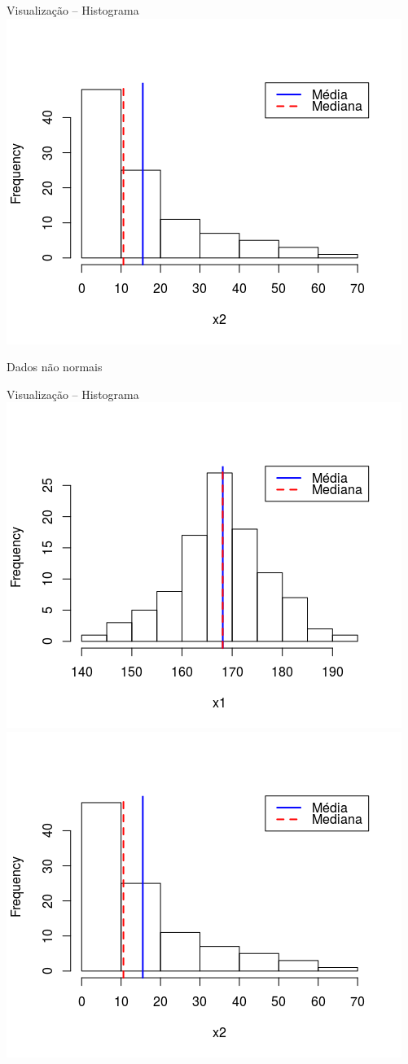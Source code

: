 \documentclass{beamer}
\begin{document}
\begin{frame}{\scriptsize Visualização -- Histograma}
  \centering
  \includegraphics[width=.7\textwidth]{Cap37-38/lognormal2-h}

  Dados não normais
\end{frame}

\begin{frame}{\scriptsize Visualização -- Histograma}
  \centering
  \includegraphics[width=.5\textwidth]{Cap37-38/normal2-h}
  \includegraphics[width=.5\textwidth]{Cap37-38/lognormal2-h}
\end{frame}
\end{document}
